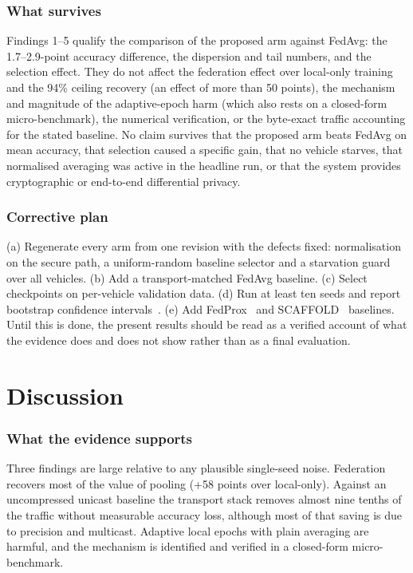 \documentclass[journal]{IEEEtran}
\begin{document}
\subsubsection*{What survives}
Findings 1--5 qualify the comparison of the proposed arm against FedAvg: the 1.7--2.9-point accuracy difference, the dispersion and tail numbers, and the selection effect. They do not affect the federation effect over local-only training and the 94\% ceiling recovery (an effect of more than 50 points), the mechanism and magnitude of the adaptive-epoch harm (which also rests on a closed-form micro-benchmark), the numerical verification, or the byte-exact traffic accounting for the stated baseline. No claim survives that the proposed arm beats FedAvg on mean accuracy, that selection caused a specific gain, that no vehicle starves, that normalised averaging was active in the headline run, or that the system provides cryptographic or end-to-end differential privacy.

\subsubsection*{Corrective plan}
(a) Regenerate every arm from one revision with the defects fixed: normalisation on the secure path, a uniform-random baseline selector and a starvation guard over all vehicles. (b) Add a transport-matched FedAvg baseline. (c) Select checkpoints on per-vehicle validation data. (d) Run at least ten seeds and report bootstrap confidence intervals~\cite{agarwal2021precipice}. (e) Add FedProx~\cite{li2020fedprox} and SCAFFOLD~\cite{karimireddy2020scaffold} baselines. Until this is done, the present results should be read as a verified account of what the evidence does and does not show rather than as a final evaluation.

\section{Discussion}\label{sec:discussion}
\subsubsection*{What the evidence supports}
Three findings are large relative to any plausible single-seed noise. Federation recovers most of the value of pooling (+58 points over local-only). Against an uncompressed unicast baseline the transport stack removes almost nine tenths of the traffic without measurable accuracy loss, although most of that saving is due to precision and multicast. Adaptive local epochs with plain averaging are harmful, and the mechanism is identified and verified in a closed-form micro-benchmark.
\end{document}
